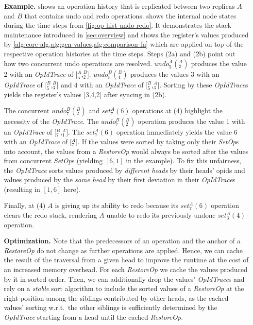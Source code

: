 \documentclass[sigplan]{acmart}
\newcommand{\opid}[2]{$\mathit{_{#1}^{#2}}$}
\newcommand{\setop}[4][set]{$\mathit{#1_{#2}^{#3}(#4)}$}
\newcommand{\undop}[5][undo]{$\mathit{#1_{#2}^{#3}(_{#4}^{#5})}$}
\newcommand{\stack}[1]{$[$#1$]$}
\newcommand{\setopkind}{\textit{SetOp}}
\newcommand{\restopkind}{\textit{RestoreOp}}
\newcommand{\opidtrace}{\textit{OpIdTrace}}
\begin{document}
\textbf{Example.}\label{sec:algo-example}
 shows an operation history that is replicated
between two replicas $A$ and $B$ that contains undo and redo operations.
 shows the internal node states during the time steps
from \cref{fig:op-hist-undo-redo}.
It demonstrates the stack maintenance introduced in \cref{sec:overview} and
shows the register's values produced by
\cref{alg:core-alg,alg:gen-values,alg:comparison-fn} which are applied on top
of the respective operation histories at the time steps.
Steps (2a) and (2b) point out how two concurrent undo operations are resolved.
\undop{5}{A}{3}{A} produces the value $2$ with an \opidtrace{} of
\stack{\opid{5}{A},\opid{2}{B}}.
\undop{5}{B}{4}{B} produces the values $3$ with an \opidtrace{} of
\stack{\opid{5}{B},\opid{3}{B}}
and $4$ with an \opidtrace{} of
\stack{\opid{5}{B},\opid{3}{A}}.
Sorting by these \opidtrace{}s yields the register's values \stack{3,4,2}
after syncing in (2b).

The concurrent \undop{7}{B}{2}{B} and \setop{7}{A}{6} operations at (4) highlight
the necessity of the \opidtrace{}.
The \undop{7}{B}{2}{B} operation produces the value $1$ with an \opidtrace{} of
\stack{\opid{7}{B},\opid{1}{A}}.
The \setop{7}{A}{6} operation immediately yields the value $6$ with an
\opidtrace{} of \stack{\opid{7}{A}}.
If the values were sorted by taking only their \setopkind{}s into account,
the values from a \restopkind{} would always be sorted after
the values from concurrent \setopkind{}s (yielding $[6, 1]$ in the example).
To fix this unfairness, the \opidtrace{} sorts values produced by
\emph{different heads} by their heads' \glspl*{opid}
and values produced by the \emph{same head}
by their first deviation in their \opidtrace{}s (resulting in $[1, 6]$ here).

Finally, at (4) $A$ is giving up its ability to redo because its
\setop{7}{A}{6} operation clears the redo stack,
rendering $A$ unable to redo its previously undone \setop{3}{A}{4} operation.

\textbf{Optimization.}\label{sec:opt}
Note that the predecessors of an operation and the
anchor of a \restopkind{} do not change as further operations are applied.
Hence, we can cache the result of the traversal from a given head
to improve the runtime at the cost of an increased memory overhead.
For each \restopkind{} we cache the values produced by it in sorted order.
Then, we can additionally drop the values'
\opidtrace{}s and rely on a \emph{stable} sort algorithm to include the sorted
values of a \restopkind{} at the right position among the siblings contributed
by other heads, as the cached values' sorting w.r.t.\ the other siblings
is sufficiently determined by the \opidtrace{} starting from a head until the
cached \restopkind{}.
\end{document}

